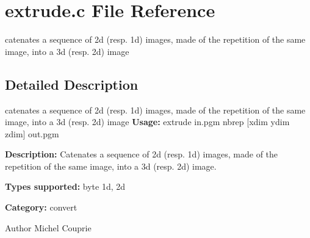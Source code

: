 \section{extrude.c File Reference}
\label{extrude_8c}


catenates a sequence of 2d (resp. 1d) images, made of the repetition of the same image, into a 3d (resp. 2d) image  




\subsection{Detailed Description}
catenates a sequence of 2d (resp. 1d) images, made of the repetition of the same image, into a 3d (resp. 2d) image {\bfseries Usage:} extrude in.pgm nbrep [xdim ydim zdim] out.pgm

{\bfseries Description:} Catenates a sequence of 2d (resp. 1d) images, made of the repetition of the same image, into a 3d (resp. 2d) image.

{\bfseries Types supported:} byte 1d, 2d

{\bfseries Category:} convert

\begin{DoxyAuthor}{Author}
Michel Couprie 
\end{DoxyAuthor}
